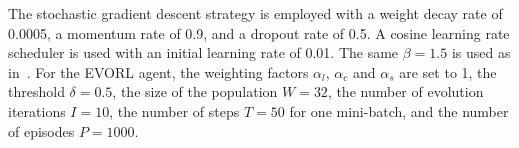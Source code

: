 \documentclass[letterpaper]{article} %
\def \eg {\emph{e.g.}}
\def \ie {\emph{i.e.}}
\newcommand\blue[1]{\textcolor{blue}{#1}}
\newcommand\rjf[1]{\textcolor{red}{\{RJF: #1\}}}
\begin{document}
The stochastic gradient descent strategy is employed with a weight decay rate of 0.0005, a momentum rate of 0.9, and a dropout rate of 0.5. 
A cosine learning rate scheduler is used with an initial learning rate of 0.01. %
The same $\beta = 1.5$ is used as in~\cite{Huang_2022_UFPMP}. For the EVORL agent, the weighting factors $\alpha_l$, $\alpha_c$ and $\alpha_s$ are set to 1, the threshold $\delta = 0.5$, the size of the population $W=32$, the number of evolution iterations $I = 10$, the number of steps $T=50$ for one mini-batch, and the number of episodes $P = 1000$. %


\end{document}
